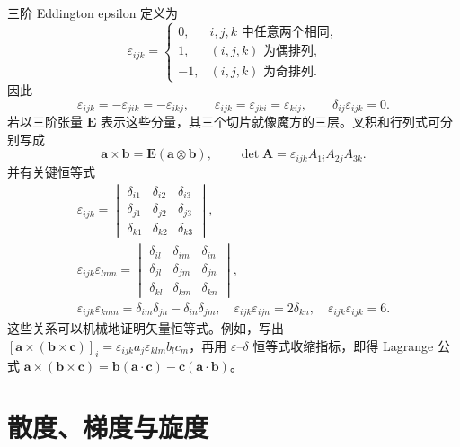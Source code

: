 \documentclass[11pt,a4paper,openany,fontset=none]{ctexbook}
\begin{document}
三阶 Eddington epsilon 定义为
\begin{equation}
 \varepsilon_{ijk}=\begin{cases}
 0,&i,j,k\text{ 中任意两个相同},\\
 1,&(i,j,k)\text{ 为偶排列},\\
 -1,&(i,j,k)\text{ 为奇排列}.
 \end{cases} \tag{1.4.13}
\end{equation}
因此
\begin{equation}
 \varepsilon_{ijk}=-\varepsilon_{jik}=-\varepsilon_{ikj},\qquad
 \varepsilon_{ijk}=\varepsilon_{jki}=\varepsilon_{kij},\qquad
 \delta_{ij}\varepsilon_{ijk}=0. \tag{1.4.14--16}
\end{equation}
若以三阶张量 $\bm E$ 表示这些分量，其三个切片就像魔方的三层。叉积和行列式可分别写成
\begin{equation}
 \bm a\times\bm b=\bm E(\bm a\otimes\bm b),\qquad
 \det\bm A=\varepsilon_{ijk}A_{1i}A_{2j}A_{3k}. \tag{1.4.20--21}
\end{equation}
并有关键恒等式
\begin{gather}
 \varepsilon_{ijk}=
 \begin{vmatrix}\delta_{i1}&\delta_{i2}&\delta_{i3}\\
 \delta_{j1}&\delta_{j2}&\delta_{j3}\\
 \delta_{k1}&\delta_{k2}&\delta_{k3}\end{vmatrix}, \tag{1.4.24}\\
 \varepsilon_{ijk}\varepsilon_{lmn}=
 \begin{vmatrix}\delta_{il}&\delta_{im}&\delta_{in}\\
 \delta_{jl}&\delta_{jm}&\delta_{jn}\\
 \delta_{kl}&\delta_{km}&\delta_{kn}\end{vmatrix}, \tag{1.4.27}\\
 \varepsilon_{ijk}\varepsilon_{kmn}=\delta_{im}\delta_{jn}-\delta_{in}\delta_{jm},\quad
 \varepsilon_{ijk}\varepsilon_{ijn}=2\delta_{kn},\quad
 \varepsilon_{ijk}\varepsilon_{ijk}=6. \tag{1.4.29--31}
\end{gather}
这些关系可以机械地证明矢量恒等式。例如，写出 $[\bm a\times(\bm b\times\bm c)]_i=\varepsilon_{ijk}a_j\varepsilon_{klm}b_lc_m$，再用 $\varepsilon$--$\delta$ 恒等式收缩指标，即得 Lagrange 公式 $\bm a\times(\bm b\times\bm c)=\bm b(\bm a\cdot\bm c)-\bm c(\bm a\cdot\bm b)$。

\section{散度、梯度与旋度}
\end{document}
